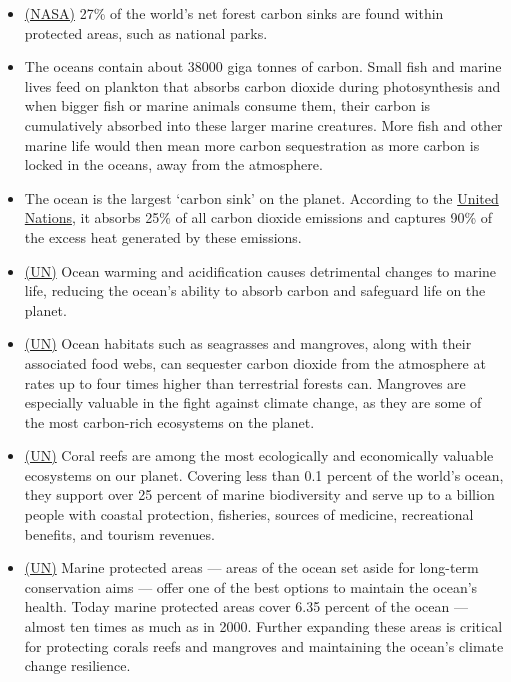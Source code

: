 \documentclass[oneside]{book}
\begin{document}
\begin{enumerate}
\begin{itemize}
            \item \href{https://www.nasa.gov/science-research/earth-science/nasa-satellites-help-quantify-forests-impacts-on-global-carbon-budget/#:~:text=Forests%20around%20the%20world%20are,from%20the%20entire%20United%20States.}{(NASA)} 27\% of the world's net forest carbon sinks are found within protected areas, such as national parks.
            \item The oceans contain about 38000 giga tonnes of carbon. Small fish and marine lives feed on plankton that absorbs carbon dioxide during photosynthesis and when bigger fish or marine animals consume them, their carbon is cumulatively absorbed into these larger marine creatures. More fish and other marine life would then mean more carbon sequestration as more carbon is locked in the oceans, away from the atmosphere.
            \item The ocean is the largest `carbon sink' on the planet. According to the \href{https://www.un.org/en/climatechange/science/climate-issues/ocean}{United Nations}, it absorbs 25\% of all carbon dioxide emissions and captures 90\% of the excess heat generated by these emissions. 
            \item \href{https://www.un.org/en/climatechange/science/climate-issues/ocean}{(UN)} Ocean warming and acidification causes detrimental changes to marine life, reducing the ocean's ability to absorb carbon and safeguard life on the planet.
            \item \href{https://www.un.org/en/climatechange/science/climate-issues/ocean}{(UN)} Ocean habitats such as seagrasses and mangroves, along with their associated food webs, can sequester carbon dioxide from the atmosphere at rates up to four times higher than terrestrial forests can. Mangroves are especially valuable in the fight against climate change, as they are some of the most carbon-rich ecosystems on the planet.
            \item \href{https://www.un.org/en/climatechange/science/climate-issues/ocean}{(UN)} Coral reefs are among the most ecologically and economically valuable ecosystems on our planet. Covering less than 0.1 percent of the world's ocean, they support over 25 percent of marine biodiversity and serve up to a billion people with coastal protection, fisheries, sources of medicine, recreational benefits, and tourism revenues.
            \item \href{https://www.un.org/en/climatechange/science/climate-issues/ocean}{(UN)} Marine protected areas --- areas of the ocean set aside for long-term conservation aims --- offer one of the best options to maintain the ocean's health. Today marine protected areas cover 6.35 percent of the ocean --- almost ten times as much as in 2000. Further expanding these areas is critical for protecting corals reefs and mangroves and maintaining the ocean's climate change resilience.

\end{itemize}
\end{enumerate}
\end{document}
